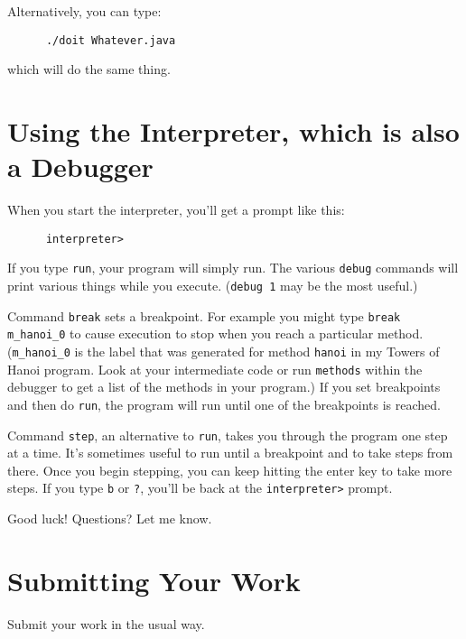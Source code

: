 \documentclass[11pt]{article}
\begin{document}
Alternatively, you can type:
\begin{verbatim}
      ./doit Whatever.java
\end{verbatim}
which will do the same thing.

\section{Using the Interpreter, which is also a Debugger}

When you start the interpreter, you'll get a prompt like this:
\begin{verbatim}
      interpreter>
\end{verbatim}
If you type \verb'run', your program will simply run.  The various \verb'debug' commands will print various things while you execute.  (\verb'debug 1' may be the most useful.)  

Command \verb'break' sets a breakpoint.  For example you might type \verb'break m_hanoi_0' to cause execution to stop when you reach a particular method.  (\verb'm_hanoi_0' is the label that was generated for method \verb'hanoi' in my Towers of Hanoi program.  Look at your intermediate code or run \verb'methods' within the debugger to get a list of the methods in your program.)  If you set breakpoints and then do \verb'run', the program will run until one of the breakpoints is reached.

Command \verb'step', an alternative to \verb'run', takes you through the program one step at a time.  It's sometimes useful to run until a breakpoint and to take steps from there.  Once you begin stepping, you can keep hitting the enter key to take more steps.  If you type \verb'b' or \verb'?', you'll be back at the \verb'interpreter>' prompt.

Good luck!  Questions?  Let me know.

\section{Submitting Your Work}
Submit your work in the usual way.
\end{document}
